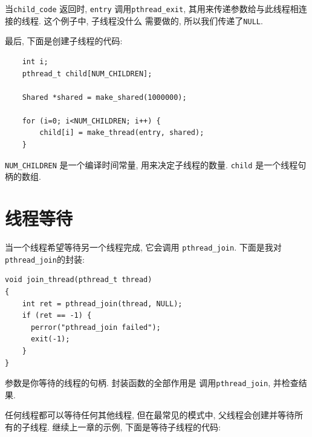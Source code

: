 \documentclass[12pt]{book}
\begin{document}
{%
当{\tt child\_code} 返回时,  {\tt entry} 调用\verb"pthread_exit", 
其用来传递参数给与此线程相连接的线程. 这个例子中, 子线程没什么
需要做的, 所以我们传递了{\tt NULL}.

最后, 下面是创建子线程的代码:

\begin{verbatim}
    int i;
    pthread_t child[NUM_CHILDREN];

    Shared *shared = make_shared(1000000);

    for (i=0; i<NUM_CHILDREN; i++) {
        child[i] = make_thread(entry, shared);
    }
\end{verbatim}

\verb"NUM_CHILDREN" 是一个编译时间常量, 用来决定子线程的数量. 
{\tt child} 是一个线程句柄的数组. 

\section{线程等待}

当一个线程希望等待另一个线程完成, 它会调用 {\tt pthread\_join}.
下面是我对{\tt pthread\_join}的封装:


\begin{verbatim}
void join_thread(pthread_t thread)
{
    int ret = pthread_join(thread, NULL);
    if (ret == -1) {
      perror("pthread_join failed");
      exit(-1);
    }
}
\end{verbatim}

参数是你等待的线程的句柄. 封装函数的全部作用是
调用{\tt pthread\_join}, 并检查结果. 

任何线程都可以等待任何其他线程, 但在最常见的模式中, 
父线程会创建并等待所有的子线程. 
继续上一章的示例, 下面是等待子线程的代码: 

}
\end{document}
